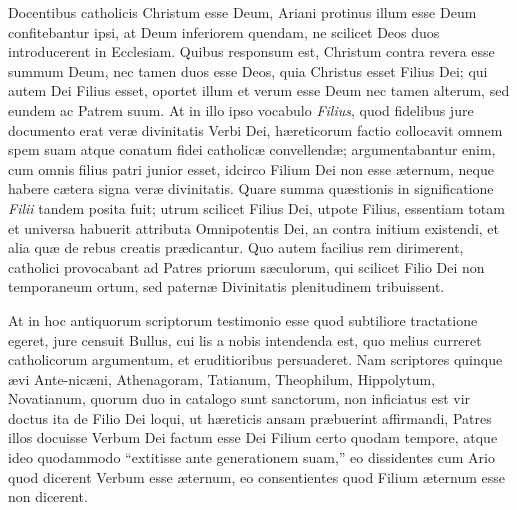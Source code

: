 Docentibus
catholicis Christum esse Deum, Ariani protinus illum esse Deum
confitebantur ipsi, at Deum inferiorem quendam, ne scilicet Deos duos
introducerent in Ecclesiam. Quibus responsum est, Christum contra
revera esse summum Deum, nec tamen duos esse Deos, quia Christus esset
Filius Dei; qui autem Dei Filius esset, oportet illum et verum esse
Deum nec tamen alterum, sed eundem ac Patrem suum. At in illo ipso
vocabulo \emph{Filius}, quod fidelibus jure documento erat veræ
divinitatis Verbi Dei, hæreticorum factio collocavit omnem spem suam
atque conatum fidei catholicæ convellendæ; argumentabantur enim, cum
omnis filius patri junior esset, idcirco Filium Dei non esse æternum,
neque habere cætera signa veræ divinitatis. Quare summa quæstionis
in significatione \emph{Filii} tandem posita fuit; utrum scilicet
Filius Dei, utpote Filius, essentiam totam et universa habuerit
attributa Omnipotentis Dei, an contra initium existendi, et alia quæ
de rebus creatis prædicantur. Quo autem facilius rem dirimerent,
catholici provocabant ad Patres priorum sæculorum, qui scilicet Filio
Dei non temporaneum ortum, sed paternæ Divinitatis plenitudinem
tribuissent.

At in hoc
antiquorum scriptorum testimonio esse quod subtiliore tractatione
egeret, jure censuit Bullus, cui lis a nobis intendenda est, quo
melius curreret catholicorum argumentum, et eruditioribus persuaderet.
Nam scriptores quinque ævi Ante-nicæni, Athenagoram, Tatianum,
Theophilum, Hippolytum, Novatianum, quorum duo in catalogo sunt
sanctorum, non inficiatus est vir doctus ita de Filio Dei loqui, ut hæreticis
ansam præbuerint affirmandi, Patres illos docuisse Verbum Dei factum
esse Dei Filium certo quodam tempore, atque ideo quodammodo ``extitisse ante generationem
suam,'' eo dissidentes cum Ario quod
dicerent Verbum esse æternum, eo consentientes quod Filium æternum
esse non dicerent.

